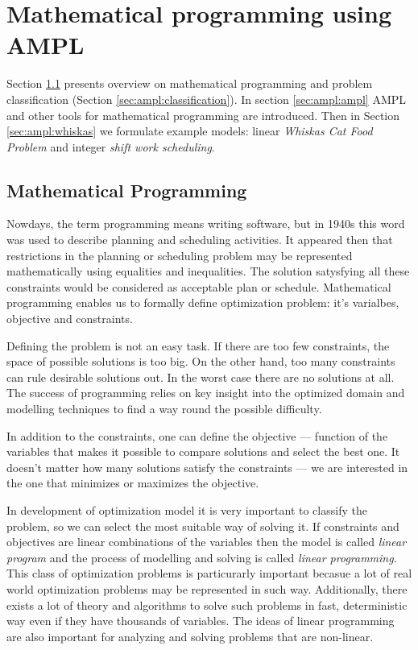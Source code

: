 \chapter{Mathematical programming using AMPL}
\label{chap:ampl} 

Section \ref{sec:ampl:mathprog} presents overview on mathematical programming and problem classification (Section \ref{sec:ampl:classification}). In section \ref{sec:ampl:ampl} AMPL and other tools for mathematical programming are introduced. Then in Section \ref{sec:ampl:whiskas} we formulate example models: linear \emph{Whiskas Cat Food Problem} and integer \emph{shift work scheduling}.

\section{Mathematical Programming}
\label{sec:ampl:mathprog}

Nowdays, the term programming\cite{Programming} means writing software, but in 1940s this word was used to describe planning and scheduling activities. It appeared then that restrictions in the planning or scheduling problem may be represented mathematically using equalities and inequalities.  The solution satysfying all these constraints would be considered as acceptable plan or schedule.  Mathematical programming enables us to formally define optimization problem: it's varialbes, objective and constraints.

Defining the problem is not an easy task. If there are too few constraints, the space of possible solutions is too big. On the other hand, too many constraints can rule desirable solutions out. In the worst case there are no solutions at all. The success of programming relies on key insight into the optimized domain and modelling techniques to find a way round the possible difficulty. 

In addition to the constraints, one can define the objective --- function of the variables that makes it possible to compare solutions and select the best one. It doesn't matter how many solutions satisfy the constraints --- we are interested in the one that minimizes or maximizes the objective.

In development of optimization model it is very important to classify the problem, so we can select the most suitable way of solving it. If constraints and objectives are linear combinations of the variables then the model is called \emph{linear program} and the process of modelling and solving is called \emph{linear programming}. This class of optimization problems is particurarly important becasue a lot of real world optimization problems may be represented in such way. Additionally, there exists a lot of theory and algorithms to solve such problems in fast, deterministic way even if they have thousands of variables. The ideas of linear programming are also important for analyzing and solving problems that are non-linear.

